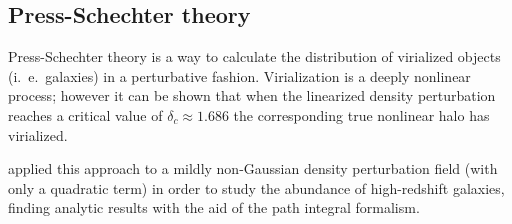 \documentclass[main.tex]{subfiles}
\begin{document}





\subsection{Press-Schechter theory}

Press-Schechter theory is a way to calculate the distribution of virialized objects (i.\ e.\ galaxies) in a perturbative fashion.
Virialization is a deeply nonlinear process; however it can be shown that when the linearized density perturbation reaches a critical value of \(\delta _c \approx 1.686\) the corresponding true nonlinear halo has virialized. 

\textcite[]{matarreseAbundanceHighRedshift2000} applied this approach to a mildly non-Gaussian density perturbation field (with only a quadratic term) in order to study the abundance of high-redshift galaxies, finding analytic results with the aid of the path integral formalism.

\end{document}

